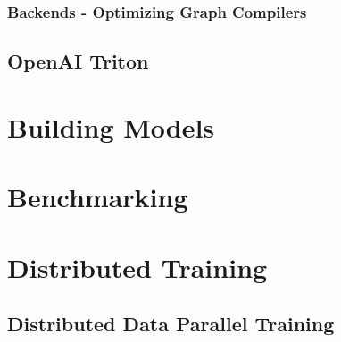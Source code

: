   \subsubsection*{Backends - Optimizing Graph Compilers}
    
    \label{subsubsec:torchinductor}
        
    \label{subsubsec:torchinductor}
        
  \subsection{OpenAI Triton}\label{subsec:openai_triton}



\section*{Building Models}\label{sec:building_models}
    \subsection{}\label{subsec:torchinductor}
      

\section*{Benchmarking}\label{sec:benchmarking}
\section*{Distributed Training\hfill\normalsize{}}
    
    \subsection*{Distributed Data Parallel Training}\label{subsec:distributed_data_parallel_training}
        
